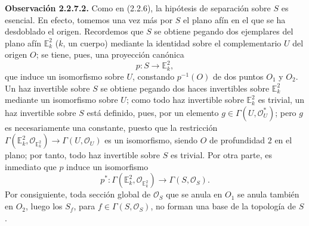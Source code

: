 \providecommand{\sisi}[2]{#2}

\textbf{Observación 2.2.7.2.} Como en (2.2.6), la hipótesis de separación sobre $S$ es esencial. En efecto, tomemos una vez más por $S$ el plano afín en el que se ha desdoblado el origen. Recordemos que $S$ se obtiene pegando dos ejemplares del plano afín $\mathbb E^2_k$ ($k$, un cuerpo) mediante la identidad sobre el complementario $U$ del origen $O$; se tiene, pues, una proyección canónica
\[
p:S\longrightarrow\mathbb E^2_k,
\]
que induce un isomorfismo sobre $U$, constando $p^{-1}(O)$ de dos puntos $O_1$ y $O_2$. Un haz invertible sobre $S$ se obtiene pegando dos haces invertibles sobre $\mathbb E^2_k$ mediante un isomorfismo sobre $U$; como todo haz invertible sobre $\mathbb E^2_k$ es trivial, un haz invertible sobre $S$ está definido, pues, por un elemento $g\in\Gamma(U,\mathcal O_U^*)$; pero $g$ es necesariamente una constante, puesto que la restricción $\Gamma(\mathbb E^2_k,\mathcal O_{\mathbb E^2_k})\to\Gamma(U,\mathcal O_U)$ es un isomorfismo, siendo $O$ de profundidad $2$ en el plano; por tanto, todo haz invertible sobre $S$ es trivial. Por otra parte, es inmediato que $p$ induce un isomorfismo
\[
p^*:\Gamma(\mathbb E^2_k,\mathcal O_{\mathbb E^2_k})\longrightarrow\Gamma(S,\mathcal O_S).
\]
Por consiguiente, toda sección global de $\mathcal O_S$ que se anula en $O_1$ se anula también en $O_2$, luego los $S_f$, para $f\in\Gamma(S,\mathcal O_S)$, no forman una base de la topología de $S$.

